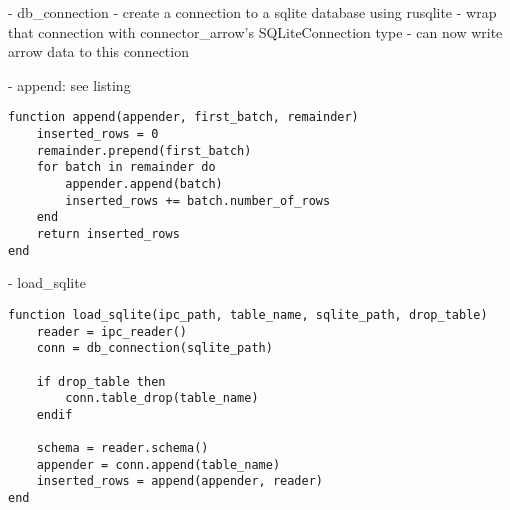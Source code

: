 - db_connection
- create a connection to a sqlite database using rusqlite
- wrap that connection with connector\_arrow's SQLiteConnection type
- can now write arrow data to this connection

- append: see listing
\begin{listing}
	\begin{verbatim}
function append(appender, first_batch, remainder)
	inserted_rows = 0
	remainder.prepend(first_batch)
	for batch in remainder do
		appender.append(batch)
		inserted_rows += batch.number_of_rows
	end
	return inserted_rows
end
	\end{verbatim}
\end{listing}

- load\_sqlite
\begin{listing}
	\begin{verbatim}
function load_sqlite(ipc_path, table_name, sqlite_path, drop_table)
	reader = ipc_reader()
	conn = db_connection(sqlite_path)

	if drop_table then
		conn.table_drop(table_name)
	endif

	schema = reader.schema()
	appender = conn.append(table_name)
	inserted_rows = append(appender, reader)
end
	\end{verbatim}
\end{listing}

